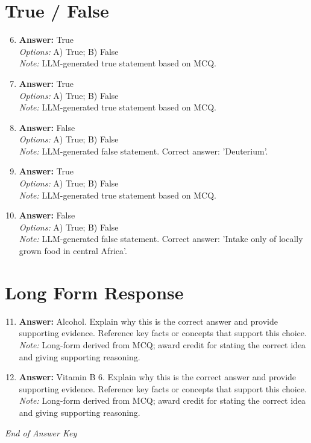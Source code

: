 \documentclass[12pt]{article}
\begin{document}
\section*{True / False}
\begin{enumerate}[label=\arabic*.]
\setcounter{enumi}{5}
\item \textbf{Answer:} True
\\ \textit{Options:} A) True; B) False
\\ \textit{Note:} LLM-generated true statement based on MCQ.
\item \textbf{Answer:} True
\\ \textit{Options:} A) True; B) False
\\ \textit{Note:} LLM-generated true statement based on MCQ.
\item \textbf{Answer:} False
\\ \textit{Options:} A) True; B) False
\\ \textit{Note:} LLM-generated false statement. Correct answer: 'Deuterium'.
\item \textbf{Answer:} True
\\ \textit{Options:} A) True; B) False
\\ \textit{Note:} LLM-generated true statement based on MCQ.
\item \textbf{Answer:} False
\\ \textit{Options:} A) True; B) False
\\ \textit{Note:} LLM-generated false statement. Correct answer: 'Intake only of locally grown food in central Africa'.
\end{enumerate}

\section*{Long Form Response}
\begin{enumerate}[label=\arabic*.]
\setcounter{enumi}{10}
\item \textbf{Answer:} Alcohol. Explain why this is the correct answer and provide supporting evidence. Reference key facts or concepts that support this choice.
\\ \textit{Note:} Long-form derived from MCQ; award credit for stating the correct idea and giving supporting reasoning.
\item \textbf{Answer:} Vitamin B 6. Explain why this is the correct answer and provide supporting evidence. Reference key facts or concepts that support this choice.
\\ \textit{Note:} Long-form derived from MCQ; award credit for stating the correct idea and giving supporting reasoning.
\end{enumerate}

\vfill
\noindent\textit{End of Answer Key}
\end{document}
